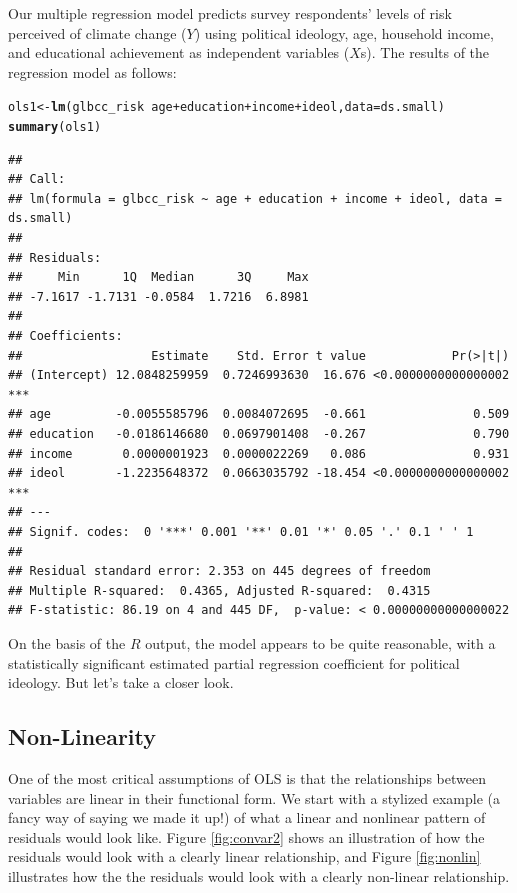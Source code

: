 \documentclass[11pt,openany]{book}\usepackage[]{graphicx}\usepackage[]{color}
\makeatletter
\newcommand{\hlopt}[1]{\textcolor[rgb]{0,0,0}{#1}}%
\newcommand{\hlstd}[1]{\textcolor[rgb]{0.345,0.345,0.345}{#1}}%
\newcommand{\hlkwb}[1]{\textcolor[rgb]{0.69,0.353,0.396}{#1}}%
\newcommand{\hlkwc}[1]{\textcolor[rgb]{0.333,0.667,0.333}{#1}}%
\newcommand{\hlkwd}[1]{\textcolor[rgb]{0.737,0.353,0.396}{\textbf{#1}}}%
\newenvironment{kframe}{%
 \def\at@end@of@kframe{}%
 \ifinner\ifhmode%
  \def\at@end@of@kframe{\end{minipage}}%
  \begin{minipage}{\columnwidth}%
 \fi\fi%
 \def\FrameCommand##1{\hskip\@totalleftmargin \hskip-\fboxsep
 \colorbox{shadecolor}{##1}\hskip-\fboxsep
     \hskip-\linewidth \hskip-\@totalleftmargin \hskip\columnwidth}%
 \MakeFramed {\advance\hsize-\width
   \@totalleftmargin\z@ \linewidth\hsize
   \@setminipage}}%
 {\par\unskip\endMakeFramed%
 \at@end@of@kframe}
\newenvironment{knitrout}{}{} %
\renewenvironment{knitrout}{\begin{singlespace}}{\end{singlespace}} %
\makeatother
\begin{document}
Our multiple regression model predicts survey respondents' levels of risk perceived of climate change ($Y$) using political ideology, age, household income,  and educational achievement as independent variables ($X$s). The results of the regression model as follows:

\begin{knitrout}
\color{fgcolor}\begin{kframe}
\begin{alltt}
\hlstd{ols1} \hlkwb{<-} \hlkwd{lm}\hlstd{(glbcc_risk} \hlopt{~} \hlstd{age} \hlopt{+} \hlstd{education} \hlopt{+} \hlstd{income} \hlopt{+} \hlstd{ideol,} \hlkwc{data} \hlstd{= ds.small)}
\hlkwd{summary}\hlstd{(ols1)}
\end{alltt}
\begin{verbatim}
## 
## Call:
## lm(formula = glbcc_risk ~ age + education + income + ideol, data = ds.small)
## 
## Residuals:
##     Min      1Q  Median      3Q     Max 
## -7.1617 -1.7131 -0.0584  1.7216  6.8981 
## 
## Coefficients:
##                  Estimate    Std. Error t value            Pr(>|t|)    
## (Intercept) 12.0848259959  0.7246993630  16.676 <0.0000000000000002 ***
## age         -0.0055585796  0.0084072695  -0.661               0.509    
## education   -0.0186146680  0.0697901408  -0.267               0.790    
## income       0.0000001923  0.0000022269   0.086               0.931    
## ideol       -1.2235648372  0.0663035792 -18.454 <0.0000000000000002 ***
## ---
## Signif. codes:  0 '***' 0.001 '**' 0.01 '*' 0.05 '.' 0.1 ' ' 1
## 
## Residual standard error: 2.353 on 445 degrees of freedom
## Multiple R-squared:  0.4365,	Adjusted R-squared:  0.4315 
## F-statistic: 86.19 on 4 and 445 DF,  p-value: < 0.00000000000000022
\end{verbatim}
\end{kframe}
\end{knitrout}

On the basis of the $R$ output, the model appears to be quite reasonable, with a statistically significant estimated partial regression coefficient for political ideology. But let's take a closer look.

\subsection{Non-Linearity} 

One of the most critical assumptions of OLS is that the relationships between variables are linear in their functional form. We start with a stylized example (a fancy way of saying we made it up!) of what a linear and nonlinear pattern of residuals would look like. Figure \ref{fig:convar2} shows an illustration of how the residuals would look with a clearly linear relationship, and Figure \ref{fig:nonlin} illustrates how the the residuals would look with a clearly non-linear relationship.  
\end{document}
